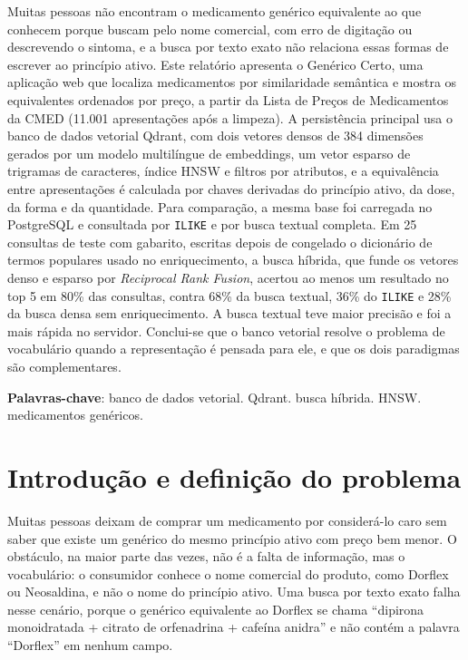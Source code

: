 \documentclass[12pt,oneside,a4paper,english,brazil]{abntex2}
\newcommand{\campo}[1]{\texttt{#1}}
\begin{document}
\begin{resumo}
Muitas pessoas não encontram o medicamento genérico equivalente ao que conhecem porque buscam pelo nome comercial, com erro de digitação ou descrevendo o sintoma, e a busca por texto exato não relaciona essas formas de escrever ao princípio ativo. Este relatório apresenta o Genérico Certo, uma aplicação web que localiza medicamentos por similaridade semântica e mostra os equivalentes ordenados por preço, a partir da Lista de Preços de Medicamentos da CMED (11.001 apresentações após a limpeza). A persistência principal usa o banco de dados vetorial Qdrant, com dois vetores densos de 384 dimensões gerados por um modelo multilíngue de embeddings, um vetor esparso de trigramas de caracteres, índice HNSW e filtros por atributos, e a equivalência entre apresentações é calculada por chaves derivadas do princípio ativo, da dose, da forma e da quantidade. Para comparação, a mesma base foi carregada no PostgreSQL e consultada por \campo{ILIKE} e por busca textual completa. Em 25 consultas de teste com gabarito, escritas depois de congelado o dicionário de termos populares usado no enriquecimento, a busca híbrida, que funde os vetores denso e esparso por \emph{Reciprocal Rank Fusion}, acertou ao menos um resultado no top 5 em 80\% das consultas, contra 68\% da busca textual, 36\% do \campo{ILIKE} e 28\% da busca densa sem enriquecimento. A busca textual teve maior precisão e foi a mais rápida no servidor. Conclui-se que o banco vetorial resolve o problema de vocabulário quando a representação é pensada para ele, e que os dois paradigmas são complementares.

\textbf{Palavras-chave}: banco de dados vetorial. Qdrant. busca híbrida. HNSW. medicamentos genéricos.
\end{resumo}

\tableofcontents*
\cleardoublepage

\textual
\pagestyle{relatorio}

\chapter{Introdução e definição do problema}

Muitas pessoas deixam de comprar um medicamento por considerá-lo caro sem saber que existe um genérico do mesmo princípio ativo com preço bem menor. O obstáculo, na maior parte das vezes, não é a falta de informação, mas o vocabulário: o consumidor conhece o nome comercial do produto, como Dorflex ou Neosaldina, e não o nome do princípio ativo. Uma busca por texto exato falha nesse cenário, porque o genérico equivalente ao Dorflex se chama ``dipirona monoidratada + citrato de orfenadrina + cafeína anidra'' e não contém a palavra ``Dorflex'' em nenhum campo.
\end{document}
